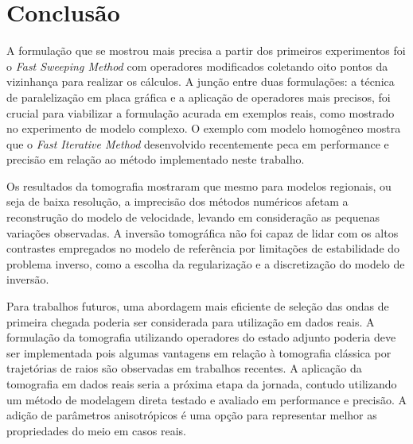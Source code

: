 \chapter{Conclusão}
\label{ch:conclusao}

A formulação que se mostrou mais precisa a partir dos primeiros experimentos foi o \textit{Fast Sweeping Method} com operadores modificados coletando oito pontos da vizinhança para realizar os cálculos. A junção entre duas formulações: a técnica de paralelização em placa gráfica e a aplicação de operadores mais precisos, foi crucial para viabilizar a formulação acurada em exemplos reais, como mostrado no experimento de modelo complexo. O exemplo com modelo homogêneo mostra que o \textit{Fast Iterative Method} desenvolvido recentemente peca em performance e precisão em relação ao método implementado neste trabalho.  

Os resultados da tomografia mostraram que mesmo para modelos regionais, ou seja de baixa resolução, a imprecisão dos métodos numéricos afetam  a reconstrução do modelo de velocidade, levando em consideração as pequenas variações observadas. A inversão tomográfica não foi capaz de lidar com os altos contrastes empregados no modelo de referência por limitações de estabilidade do problema inverso, como a escolha da regularização e a discretização do modelo de inversão. 

Para trabalhos futuros, uma abordagem mais eficiente de seleção das ondas de primeira chegada poderia ser considerada para utilização em dados reais. A formulação da tomografia utilizando operadores do estado adjunto poderia deve ser implementada pois algumas vantagens em relação à tomografia clássica por trajetórias de raios são observadas em trabalhos recentes. A aplicação da tomografia em dados reais seria a próxima etapa da jornada, contudo utilizando um método de modelagem direta testado e avaliado em performance e precisão. A adição de parâmetros anisotrópicos é uma opção para representar melhor as propriedades do meio em casos reais. 

